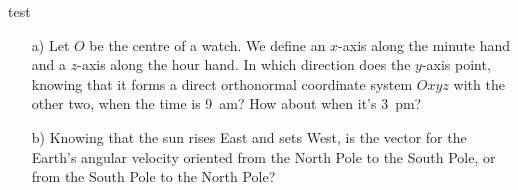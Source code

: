 %
%

\begin{center}
\vspace*{5mm}
\end{center}
test

\begin{enumerate}
\item[a)] Let $O$ be the centre of a watch. We define an $x$-axis along the minute hand and a $z$-axis along the hour hand. In which direction does the $y$-axis point, knowing that it forms a direct orthonormal coordinate system $Oxyz$ with the other two, when the time is 9~am? How about when it's 3~pm?

\item[b)] Knowing that the sun rises East and sets West, is the vector for the Earth's angular velocity oriented from the North Pole to the South Pole, or from the South Pole to the North Pole?
\end{enumerate}
